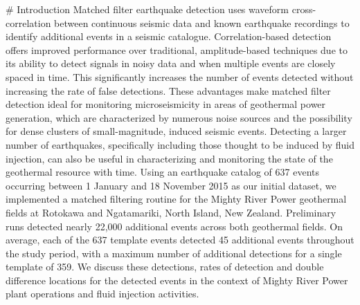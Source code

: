 # Introduction
Matched filter earthquake detection uses waveform cross-correlation between continuous seismic data and known earthquake recordings to identify additional events in a seismic catalogue. Correlation-based detection offers improved performance over traditional, amplitude-based techniques due to its ability to detect signals in noisy data and when multiple events are closely spaced in time. This significantly increases the number of events detected without increasing the rate of false detections. These advantages make matched filter detection ideal for monitoring microseismicity in areas of geothermal power generation, which are characterized by numerous noise sources and the possibility for dense clusters of small-magnitude, induced seismic events. Detecting a larger number of earthquakes, specifically including those thought to be induced by fluid injection, can also be useful in characterizing and monitoring the state of the geothermal resource with time. Using an earthquake catalog of 637 events occurring between 1 January and 18 November 2015 as our initial dataset, we implemented a matched filtering routine for the Mighty River Power geothermal fields at Rotokawa and Ngatamariki, North Island, New Zealand. Preliminary runs detected nearly 22,000 additional events across both geothermal fields. On average, each of the 637 template events detected 45 additional events throughout the study period, with a maximum number of additional detections for a single template of 359. We discuss these detections, rates of detection and double difference locations for the detected events in the context of Mighty River Power plant operations and fluid injection activities. 